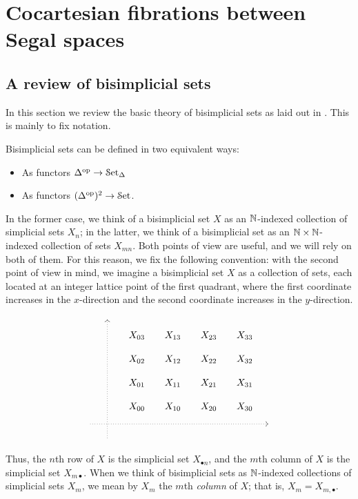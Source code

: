 \documentclass[main.tex]{subfiles}
\begin{document}
\section{Cocartesian fibrations between Segal spaces}
\label{sec:cocartesian_fibrations_between_complete_segal_spaces}

\subsection{A review of bisimplicial sets}
\label{ssc:a_review_of_bisimplicial_sets}

In this section we review the basic theory of bisimplicial sets as laid out in \cite{qcats_vs_segal_spaces}. This is mainly to fix notation.

Bisimplicial sets can be defined in two equivalent ways:
\begin{itemize}
  \item As functors $\Delta^{\mathrm{op}} \to \mathcal{S}\mathrm{et}_{\Delta}$

  \item As functors $(\Delta^{\mathrm{op}})^{2} \to \mathcal{S}\mathrm{et}$.
\end{itemize}
In the former case, we think of a bisimplicial set $X$ as an $\mathbb{N}$-indexed collection of simplicial sets $X_{n}$; in the latter, we think of a bisimplicial set as an $\mathbb{N} \times \mathbb{N}$-indexed collection of sets $X_{mn}$. Both points of view are useful, and we will rely on both of them. For this reason, we fix the following convention: with the second point of view in mind, we imagine a bisimplicial set $X$ as a collection of sets, each located at an integer lattice point of the first quadrant, where the first coordinate increases in the $x$-direction and the second coordinate increases in the $y$-direction.
\begin{equation*}
  \begin{tikzcd}[row sep=small, column sep=small]
    & \
    \arrow[dddddd, leftarrow, dotted, at start]
    \\
    && X_{03}
    & X_{13}
    & X_{23}
    & X_{33}
    \\
    && X_{02}
    & X_{12}
    & X_{22}
    & X_{32}
    \\
    && X_{01}
    & X_{11}
    & X_{21}
    & X_{31}
    \\
    && X_{00}
    & X_{10}
    & X_{20}
    & X_{30}
    \\
    \
    \arrow[rrrrrr, dotted, at end]
    &&&&&& \
    \\
    & \
  \end{tikzcd}
\end{equation*}
Thus, the $n$th row of $X$ is the simplicial set $X_{\bullet n}$, and the $m$th column of $X$ is the simplicial set $X_{m \bullet}$. When we think of bisimplicial sets as $\mathbb{N}$-indexed collections of simplicial sets $X_{m}$, we mean by $X_{m}$ the $m$th \emph{column} of $X$; that is, $X_{m} = X_{m, \bullet}$.
\end{document}
